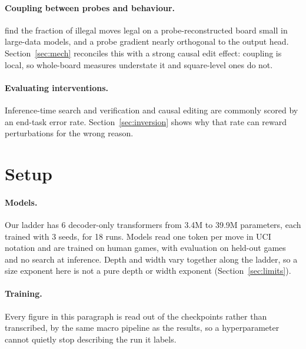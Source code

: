 \documentclass[11pt]{article}
\begin{document}
\paragraph{Coupling between probes and behaviour.}
\citet{balogh2026verification} find the fraction of illegal moves legal on a
probe-reconstructed board small in large-data models, and a probe gradient
nearly orthogonal to the output head. Section~\ref{sec:mech} reconciles this with
a strong causal edit effect: coupling is local, so whole-board measures
understate it and square-level ones do not.

\paragraph{Evaluating interventions.}
Inference-time search and verification \citep{yao2023tree,lightman2024lets,
wang2023selfconsistency} and causal editing \citep{meng2022locating} are commonly
scored by an end-task error rate. Section~\ref{sec:inversion} shows why that rate
can reward perturbations for the wrong reason.

\section{Setup}
\label{sec:setup}

\paragraph{Models.}
Our ladder has 6 decoder-only transformers from 3.4M
to 39.9M parameters, each trained with 3 seeds, for
18 runs. Models read one token per move in UCI notation and are
trained on human games, with evaluation on held-out games and no search at inference. Depth and
width vary together along the ladder, so a size exponent here is not a pure
depth or width exponent (Section~\ref{sec:limits}).


\paragraph{Training.}
Every figure in this paragraph is read out of the checkpoints rather than
transcribed, by the same macro pipeline as the results, so a hyperparameter
cannot quietly stop describing the run it labels.
\end{document}
